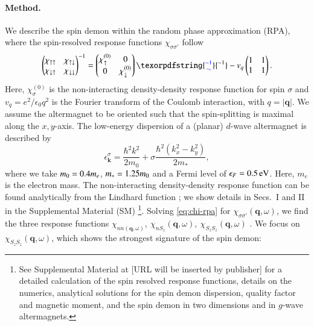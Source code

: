 \documentclass[aps,prl,reprint,twocolumns,superscriptaddress]{revtex4-2}
\DeclareMathOperator{\Imm}{Im}
\newcommand{\subfigref}[2]{Fig.~\hyperref[#1]{\ref*{#1}#2}}
\providecommand{\DIFaddtex}[1]{{\protect\color{blue}\uwave{#1}}} %
\providecommand{\DIFaddbegin}{} %
\providecommand{\DIFaddend}{} %
\providecommand{\DIFadd}[1]{\texorpdfstring{\DIFaddtex{#1}}{#1}} %
\begin{document}
	
	\DIFaddend %

	
	
	
	
	\paragraph{Method.}
	We describe the spin demon within the random phase approximation (RPA), where the spin-resolved response functions $\chi_{\sigma\sigma'}$ follow \cite{giulianiQuantumTheoryElectron2005}
	\begin{equation}
		\begin{pmatrix}
			\chi_{\uparrow\uparrow} & \chi_{\uparrow\downarrow} \\ 
			\chi_{\downarrow\uparrow} & \chi_{\downarrow\downarrow}
		\end{pmatrix}^{-1} = \begin{pmatrix}
			\chi_\uparrow^{(0)} & 0 \\
			0 & \chi_\downarrow^{(0)}
		\end{pmatrix}\DIFaddbegin \DIFadd{^{-1}
		}\DIFaddend - v_q \begin{pmatrix}
			1 & 1 \\ 1 & 1 
		\end{pmatrix} \label{eq:chi-rpa}.
	\end{equation}
	Here, $\chi_\sigma^{(0)}$ is the non-interacting density-density response function for spin $\sigma$ and $v_q=e^2/\epsilon_0 q^2$ is the Fourier transform of the Coulomb interaction, with $q=|\bm q|$. We assume the altermagnet to be oriented such that the spin-splitting is maximal along the $x,y$-axis. The low-energy dispersion of a (planar) $d$-wave altermagnet is  described by \cite{smejkalEmergingResearchLandscape2022}
	\begin{equation}
		\epsilon_{\bm k}^\sigma = \frac{\hbar^2 k^2}{2m_0} + \sigma\frac{\hbar^2 \left( k_x^2-k_y^2\right)}{2m_*} ,
	\end{equation}
	where we take $m_0=0.4 m_e$, $m_*=1.25 m_0$ and a Fermi level of $\epsilon_F=\SI{0.5}{eV}$. Here, $m_e$ is the electron mass.
	The non-interacting density-density response function can  be found analytically from the Lindhard function \cite{ahnAnisotropicFermionicQuasiparticles2021}; we show details in Secs.~I and II in the Supplemental Material (SM) \footnote{See Supplemental Material at [URL will be inserted by publisher] for a detailed calculation of the spin resolved response functions, details on the numerics, analytical solutions for the spin demon dispersion, quality factor and magnetic moment, and the spin demon in two dimensions and in $g$-wave altermagnets.}. Solving \cref{eq:chi-rpa} for $\chi_{\sigma\sigma'}(\bm q,\omega)$, we find the three response functions $\chi_{nn(\bm q,\omega)},\ \chi_{nS_z}(\bm q,\omega),\ \chi_{S_zS_z}(\bm q,\omega)$ \cite{giulianiQuantumTheoryElectron2005}. We focus on $\chi_{S_zS_z}(\bm q,\omega)$, which shows the strongest signature of the spin demon:
\end{document}

